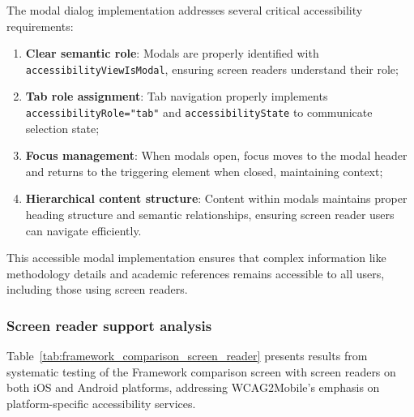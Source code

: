 \FloatBarrier

The modal dialog implementation addresses several critical accessibility requirements:

\begin{enumerate}
    \item \textbf{Clear semantic role}: Modals are properly identified with \texttt{accessibilityViewIsModal}, ensuring screen readers understand their role;
    
    \item \textbf{Tab role assignment}: Tab navigation properly implements \texttt{accessibilityRole="tab"} and \texttt{accessibilityState} to communicate selection state;
    
    \item \textbf{Focus management}: When modals open, focus moves to the modal header and returns to the triggering element when closed, maintaining context;
    
    \item \textbf{Hierarchical content structure}: Content within modals maintains proper heading structure and semantic relationships, ensuring screen reader users can navigate efficiently.
\end{enumerate}

This accessible modal implementation ensures that complex information like methodology details and academic references remains accessible to all users, including those using screen readers.

\subsubsection{Screen reader support analysis}

Table~\ref{tab:framework_comparison_screen_reader} presents results from systematic testing of the Framework comparison screen with screen readers on both iOS and Android platforms, addressing WCAG2Mobile's emphasis on platform-specific accessibility services.

